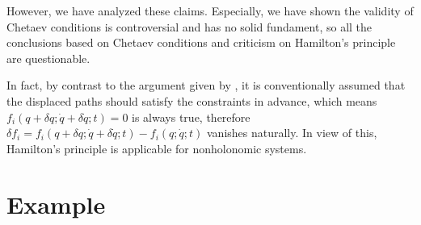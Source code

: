 \documentclass[preprint,11pt]{elsarticle}
\begin{document}
However, we have analyzed these claims. Especially, we have shown the validity of Chetaev conditions is controversial and has no solid fundament, so all the conclusions based on Chetaev conditions and criticism on Hamilton's principle are questionable.

In fact, by contrast to the argument given by {\cite{flannery2005}}, it is conventionally
assumed that the displaced paths should satisfy the constraints in advance,
which means $f_i ( q + \delta q ; \dot{q} + \delta \dot{q} ; t) = 0$ is always
true, therefore $\delta f_i = f_i ( q + \delta q ; \dot{q} + \delta \dot{q} ;
t) - f_i ( q ; \dot{q} ; t)$ vanishes naturally.
In view of this, Hamilton's principle is applicable for nonholonomic systems.



\section{Example}
\end{document}
